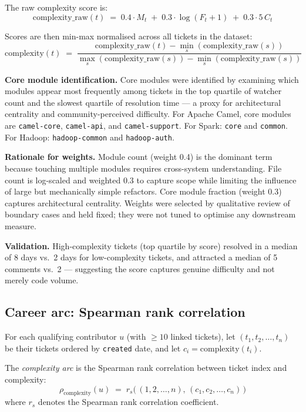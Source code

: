 \documentclass[12pt,a4paper]{article}
\begin{document}
The raw complexity score is:
\begin{equation}
  \text{complexity\_raw}(t) \;=\;
  0.4 \cdot M_t \;+\; 0.3 \cdot \log(F_t + 1) \;+\; 0.3 \cdot 5\,C_t
  \label{eq:complexity_raw}
\end{equation}

Scores are then min-max normalised across all tickets in the dataset:
\begin{equation}
  \text{complexity}(t) \;=\;
  \frac{\text{complexity\_raw}(t) - \min_s(\text{complexity\_raw}(s))}
       {\max_s(\text{complexity\_raw}(s)) - \min_s(\text{complexity\_raw}(s))}
  \label{eq:complexity_norm}
\end{equation}

\textbf{Core module identification.} Core modules were identified by
examining which modules appear most frequently among tickets in the
top quartile of watcher count and the slowest quartile of resolution
time --- a proxy for architectural centrality and community-perceived
difficulty. For Apache Camel, core modules are \texttt{camel-core},
\texttt{camel-api}, and \texttt{camel-support}. For Spark:
\texttt{core} and \texttt{common}. For Hadoop:
\texttt{hadoop-common} and \texttt{hadoop-auth}.

\textbf{Rationale for weights.} Module count (weight 0.4) is the
dominant term because touching multiple modules requires
cross-system understanding. File count is log-scaled and
weighted 0.3 to capture scope while limiting the influence of
large but mechanically simple refactors. Core module fraction
(weight 0.3) captures architectural centrality.
Weights were selected by qualitative review of boundary cases
and held fixed; they were not tuned to optimise any
downstream measure.

\textbf{Validation.} High-complexity tickets (top quartile by score)
resolved in a median of 8 days vs.\ 2 days for low-complexity tickets,
and attracted a median of 5 comments vs.\ 2 --- suggesting the score
captures genuine difficulty and not merely code volume.

\subsection{Career arc: Spearman rank correlation}

For each qualifying contributor $u$ (with $\geq10$ linked tickets),
let $(t_1, t_2, \ldots, t_n)$ be their tickets ordered by
\texttt{created} date, and let $c_i = \text{complexity}(t_i)$.

The \textit{complexity arc} is the Spearman rank correlation
between ticket index and complexity:
\begin{equation}
  \rho_{\text{complexity}}(u) \;=\;
  r_s\bigl(\,(1,2,\ldots,n),\,(c_1, c_2, \ldots, c_n)\,\bigr)
  \label{eq:rho_complexity}
\end{equation}
where $r_s$ denotes the Spearman rank correlation coefficient.
\end{document}
